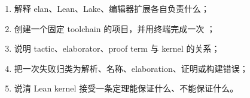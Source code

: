 \begin{checkpointbox}
\begin{enumerate}
  \item 解释 elan、Lean、Lake、编辑器扩展各自负责什么；
  \item 创建一个固定 toolchain 的项目，并用终端完成一次 ；
  \item 说明 tactic、elaborator、proof term 与 kernel 的关系；
  \item 把一次失败归类为解析、名称、elaboration、证明或构建错误；
  \item 说清 Lean kernel 接受一条定理能保证什么、不能保证什么。
\end{enumerate}
\end{checkpointbox}
